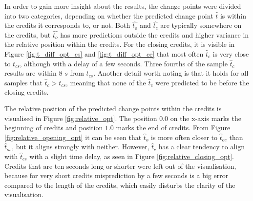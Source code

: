 In order to gain more insight about the results, the change points were divided into two categories, depending on whether the predicted change point $\hat{t}$ is within the credits it corresponds to, or not. Both $\hat{t_o}$ and $\hat{t_c}$ are typically somewhere on the credits, but $\hat{t_o}$ has more predictions outside the credits and higher variance in the relative position within the credits. For the closing credits, it is visible in Figure \ref{fig:t_diff_opt_cs} and \ref{fig:t_diff_opt_ce} that most often $\hat{t}_c$ is very close to $t_{cs}$, although with a delay of a few seconds. Three fourths of the sample $\hat{t}_c$ results are within $8$ $s$ from $t_{cs}$. Another detail worth noting is that 
it holds for all samples that $ \hat{t}_c > t_{cs}$, meaning that none of the $\hat{t}_c$ were predicted to be before the closing credits.

The relative position of the predicted change points within the credits is visualised in Figure \ref{fig:relative_opt}. The position $0.0$ on the x-axis marks the beginning of credits and position $1.0$ marks the end of credits. From Figure \ref{fig:relative_opening_opt} it can be seen that $\hat{t}_o$ is more often closer to $\hat{t}_{oe}$ than $\hat{t}_{os}$, but it aligns strongly with neither. However, $\hat{t}_c$ has a clear tendency to align with $\hat{t}_{cs}$ with a slight time delay, as seen in Figure \ref{fig:relative_closing_opt}. Credits that are ten seconds long or shorter were left out of the visualisation, because for very short credits misprediction by a few seconds is a big error compared to the length of the credits, which easily disturbs the clarity of the visualisation.

